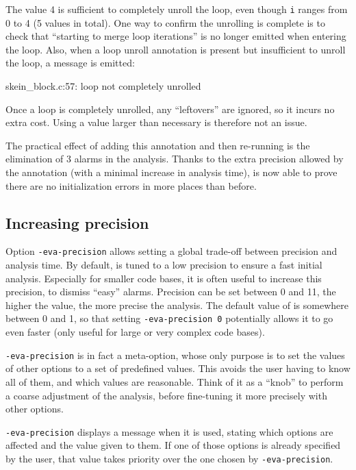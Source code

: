 \documentclass{frama-c-book}
\begin{document}
The value 4 is sufficient to completely unroll the loop, even though \verb|i|
ranges from 0 to 4 (5 values in total). One way to confirm the unrolling is
complete is to check that ``starting to merge loop iterations'' is no
longer emitted when entering the loop. Also, when a loop unroll annotation
is present but insufficient to unroll the loop, a message is emitted:

\begin{logs}
 skein_block.c:57: loop not completely unrolled
\end{logs}

Once a loop is completely unrolled, any ``leftovers'' are ignored, so it incurs
no extra cost. Using a value larger than necessary is therefore not an issue.

The practical effect of adding this annotation and then re-running \Eva{} is
the elimination of 3 alarms in the analysis. Thanks to the extra precision
allowed by the annotation (with a minimal increase in analysis time), \Eva{}
is now able to prove there are no initialization errors in more places than
before.

\subsection{Increasing precision}

Option \verb|-eva-precision| allows setting a global trade-off between
precision and analysis time. By default, \Eva{} is tuned to a low precision
to ensure a fast initial analysis. Especially for smaller code bases, it is
often useful to increase this precision, to dismiss ``easy'' alarms.
Precision can be set between 0 and 11, the higher the value, the more precise
the analysis. The default value of \Eva{} is somewhere between 0 and 1, so that
setting \verb|-eva-precision 0| potentially allows it to go even faster
(only useful for large or very complex code bases).

\verb|-eva-precision| is in fact a meta-option, whose only purpose is to set
the values of other options to a set of predefined values. This avoids the user
having to know all of them, and which values are reasonable. Think of it as a
``knob'' to perform a coarse adjustment of the analysis, before fine-tuning
it more precisely with other options.

\verb|-eva-precision| displays a message when it is used, stating which options
are affected and the value given to them. If one of those options is already
specified by the user, that value takes priority over the one chosen by
\verb|-eva-precision|.
\end{document}
